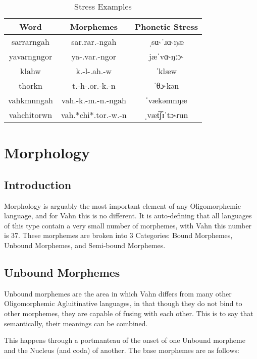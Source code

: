 \documentclass{article}
\begin{document}
\begin{table}[H]
    \centering
    \begin{tabular}{c|c|c}
        Word & Morphemes & Phonetic Stress \\
        \hline
        sarrarngah & sar.rar.-ngah & ˌsɑ˞ˈɹɑ˞ŋæ  \\
        yavarngngor & ya-.var.-ngor & jæˈvɑ˞ŋːɔ˞ \\
        klahw & k.-l-.ah.-w & ˈklæw \\
        thorkn & t.-h-.or.-k.-n & ˈθɔ˞kən \\
        vahkmnngah & vah.-k.-m.-n.-ngah & ˈvækəmnŋæ \\
        vahchitorwn & vah.*chi*.tor.-w.-n & ˌvæt͡ʃɪˈtɔ˞ɾun
    \end{tabular}
    \caption{Stress Examples}
    \label{Stress Examples}
\end{table}

\newpage

\section{Morphology}

\subsection{Introduction}

Morphology is arguably the most important element of any Oligomorphemic language, and for Vahn this
is no different. It is auto-defining that all languages of this type contain a very small number of
morphemes, with Vahn this number is 37. These morphemes are broken into 3 Categories: Bound
Morphemes, Unbound Morphemes, and Semi-bound Morphemes.

\subsection{Unbound Morphemes}

Unbound morphemes are the area in which Vahn differs from many other Oligomorphemic Agluitinative
languages, in that though they do not bind to other morphemes, they are capable of fusing with each
other. This is to say that semantically, their meanings can be combined.

This happens through a portmanteau of the onset of one Unbound morpheme and the Nucleus (and coda)
of another. The base morphemes are as follows:
\end{document}
